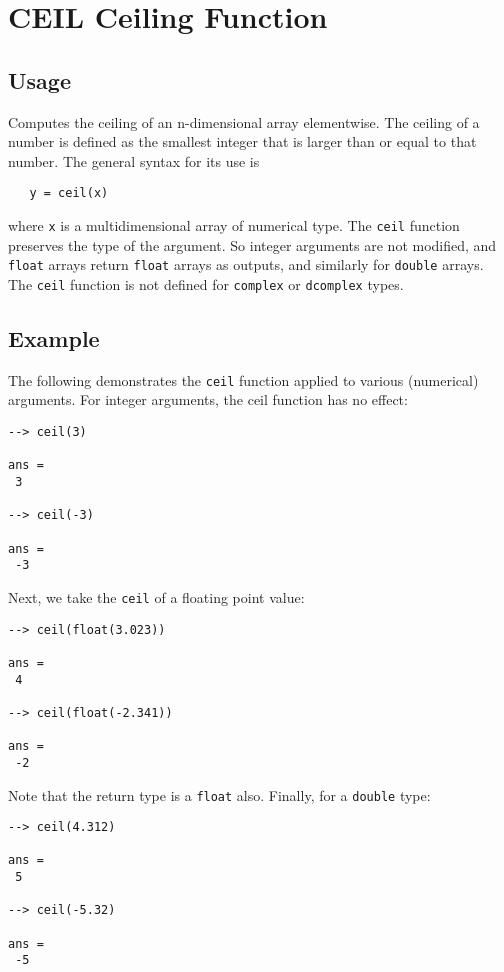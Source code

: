 \section{CEIL Ceiling Function}

\subsection{Usage}

Computes the ceiling of an n-dimensional array elementwise.  The
ceiling of a number is defined as the smallest integer that is
larger than or equal to that number. The general syntax for its use
is
\begin{verbatim}
   y = ceil(x)
\end{verbatim}
where \verb|x| is a multidimensional array of numerical type.  The \verb|ceil| 
function preserves the type of the argument.  So integer arguments 
are not modified, and \verb|float| arrays return \verb|float| arrays as 
outputs, and similarly for \verb|double| arrays.  The \verb|ceil| function 
is not defined for \verb|complex| or \verb|dcomplex| types.
\subsection{Example}

The following demonstrates the \verb|ceil| function applied to various
(numerical) arguments.  For integer arguments, the ceil function has
no effect:
\begin{verbatim}
--> ceil(3)

ans = 
 3 

--> ceil(-3)

ans = 
 -3 
\end{verbatim}
Next, we take the \verb|ceil| of a floating point value:
\begin{verbatim}
--> ceil(float(3.023))

ans = 
 4 

--> ceil(float(-2.341))

ans = 
 -2 
\end{verbatim}
Note that the return type is a \verb|float| also.  Finally, for a \verb|double|
type:
\begin{verbatim}
--> ceil(4.312)

ans = 
 5 

--> ceil(-5.32)

ans = 
 -5 
\end{verbatim}
